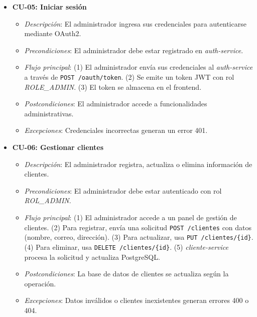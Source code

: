 \documentclass[a4paper,12pt]{article}
\begin{document}
\begin{itemize}
    \item \textbf{CU-05: Iniciar sesión}
    \begin{itemize}
        \item \textit{Descripción}: El administrador ingresa sus credenciales para autenticarse mediante OAuth2.
        \item \textit{Precondiciones}: El administrador debe estar registrado en \textit{auth-service}.
        \item \textit{Flujo principal}: (1) El administrador envía sus credenciales al \textit{auth-service} a través de \texttt{POST /oauth/token}. (2) Se emite un token JWT con rol \textit{ROLE\_ADMIN}. (3) El token se almacena en el frontend.
        \item \textit{Postcondiciones}: El administrador accede a funcionalidades administrativas.
        \item \textit{Excepciones}: Credenciales incorrectas generan un error 401.
    \end{itemize}

    \item \textbf{CU-06: Gestionar clientes}
    \begin{itemize}
        \item \textit{Descripción}: El administrador registra, actualiza o elimina información de clientes.
        \item \textit{Precondiciones}: El administrador debe estar autenticado con rol \textit{ROL\_ADMIN}.
        \item \textit{Flujo principal}: (1) El administrador accede a un panel de gestión de clientes. (2) Para registrar, envía una solicitud \texttt{POST /clientes} con datos (nombre, correo, dirección). (3) Para actualizar, usa \texttt{PUT /clientes/\{id\}}. (4) Para eliminar, usa \texttt{DELETE /clientes/\{id\}}. (5) \textit{cliente-service} procesa la solicitud y actualiza PostgreSQL.
        \item \textit{Postcondiciones}: La base de datos de clientes se actualiza según la operación.
        \item \textit{Excepciones}: Datos inválidos o clientes inexistentes generan errores 400 o 404.
    \end{itemize}


\end{itemize}
\end{document}
